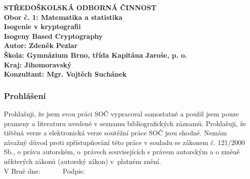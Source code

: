 \documentclass[12pt]{report}
\begin{document}
\begin{titlepage}
{
\centering
\LARGE \textbf{STŘEDOŠKOLSKÁ ODBORNÁ ČINNOST}\\
\Large\textbf{Obor č. 1: Matematika a statistika}\\
\vspace{6cm}
\LARGE\textbf{Isogenie v kryptografii}\\
\vspace{1cm}
\LARGE\textbf{Isogeny Based Cryptography}\\
}
\vspace{6cm}
{\noindent\large\bfseries Autor: Zdeněk Pezlar\\ 
	\large\bfseries Škola: Gymnázium Brno, třída Kapitána Jaroše, p. o.\\
    \large\bfseries Kraj: Jihomoravský \\
	\large\bfseries Konzultant: Mgr. Vojtěch Suchánek\\}

\end{titlepage}

\newpage
\thispagestyle{empty}
\vspace*{14cm}
\subsubsection*{Prohlášení}

Prohlašuji, že jsem svou práci SOČ vypracoval samostatně a použil jsem pouze prameny a literaturu uvedené v seznamu bibliografických záznamů.
Prohlašuji, že tištěná verze a elektronická verze soutěžní práce SOČ jsou shodné. 
Nemám závažný důvod proti zpřístupňování této práce v souladu se zákonem č. 121/2000 Sb., o právu autorském, o~právech souvisejících s právem autorským a o změně některých zákonů (autorský zákon) v~platném znění. \\[1cm]
V Brně dne: \dotfill \ \ \ \ \ \  Podpis: \dotfill
\end{document}
